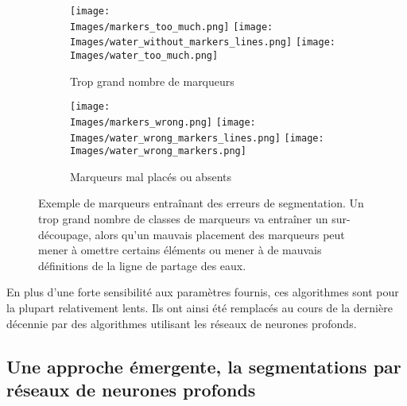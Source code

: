 \documentclass[\main/main.tex]{subfiles}
\providecommand{\Images}{\main/Figures/intro_seg}
\begin{document}
\begin{figure}[h]
    \begin{subfigure}[b]{\textwidth}
       \caption{
           \label{fig:watershed:errors:quantite}
            Trop grand nombre de marqueurs
            }
       \centering \texttt{[image: \\Images/markers\_too\_much.png]} \texttt{[image: \\Images/water\_without\_markers\_lines.png]}
       \centering \texttt{[image: \\Images/water\_too\_much.png]}
    \end{subfigure}
    \begin{subfigure}[b]{\textwidth}
       \caption{
           \label{fig:watershed:errors:position}
            Marqueurs mal placés ou absents
            }
       \centering \texttt{[image: \\Images/markers\_wrong.png]} \texttt{[image: \\Images/water\_wrong\_markers\_lines.png]}
       \centering \texttt{[image: \\Images/water\_wrong\_markers.png]}
       \centering
    \end{subfigure}
    \caption{
        Exemple de marqueurs entraînant des erreurs de segmentation.\newline
        Un trop grand nombre de classes de marqueurs va entraîner un sur\hyp{}découpage, alors qu'un mauvais placement des marqueurs peut mener à omettre certains éléments ou mener à de mauvais définitions de la ligne de partage des eaux.
    }
    
\end{figure}

%
En plus d'une forte sensibilité aux paramètres fournis, ces algorithmes sont pour la plupart relativement lents.
%
Ils ont ainsi été remplacés au cours de la dernière décennie par des algorithmes utilisant les réseaux de neurones profonds.

    \subsection{Une approche émergente, la segmentations par réseaux de neurones profonds}
\end{document}
